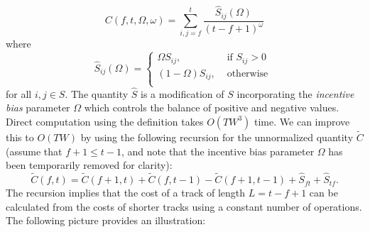 \documentclass[twocolumn]{article}
\begin{document}
	\begin{dmath*}
	C(f,t, \Omega, \omega) =	\sum_{i,j=f}^{t} \frac{ \hat S_{ij}(\Omega) }{ ( t - f + 1)^\omega }
	\end{dmath*}
where
	\begin{dmath*}
		\hat S_{ij}(\Omega)=	{ \left\{
			\begin{array}{ll}
				\Omega {S}_{ij},  & \text{~if~}{S}_{ij} > 0   \\
				 \left( 1-\Omega \right) {S}_{ij}, & \mbox{~otherwise~}\\
			\end{array}
			\right.} 
	\end{dmath*} 
for all $i,j \in {S}$. The quantity $\hat S$ is a modification of $S$ incorporating the \textit{incentive bias} parameter $\Omega$ which controls the balance of
positive and negative values. Direct computation using the definition
takes $O(TW^3)$ time. We can improve this to
$O(TW)$ by using the following recursion for the unnormalized quantity $\tilde C$ (assume that $f+1 \le t-1$, and note that the incentive bias parameter $\Omega$ has been temporarily removed for clarity):
	\begin{dmath*}
		\tilde C(f,t) = \tilde C(f+1,t) + \tilde C(f,t-1) - \tilde C(f+1,t-1) + \hat S_{ft} + \hat S_{tf}.
	\end{dmath*} 
The recursion implies that the cost of a track of length $L=t-f+1$ can
be calculated from the costs of shorter tracks using a constant number
of operations. The following picture provides an
illustration:
	
\end{document}
